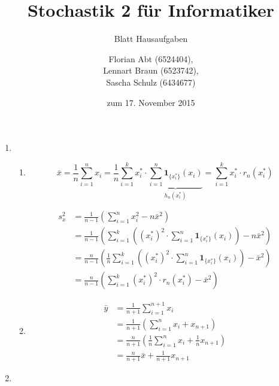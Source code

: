 \documentclass[a4paper]{scrartcl}
\title{Stochastik 2 für Informatiker}
\subtitle{Blatt {\blattnr} Hausaufgaben}
\author{
    Florian Abt (6524404), \\
    Lennart Braun (6523742), \\
    Sascha Schulz (6434677)
}
\date{zum 17. November 2015}
\def \blattnr {6}
\begin{document}
\maketitle

\begin{enumerate}[label=\bfseries \blattnr.\arabic*]

\item
\begin{enumerate}
 \item 
 
 \begin{equation*}
      \bar{x} 
      = \frac1n \sum_{i=1}^n x_i 
      = \frac1n \sum_{i=1}^k x_i^* \cdot \underbrace{\sum_{i=1}^n \textbf{1}_{\{x_i^*\}}(x_i)}_{h_n(x_i^*)}
      = \sum_{i=1}^k x_i^* \cdot r_n(x_i^*)
 \end{equation*}
 
 \begin{equation*}
  \begin{split}
     s_x^2 
     &= \frac1{n-1} \left( \sum_{i=1}^n x_i^2 - n\bar{x}^2 \right) \\
     &= \frac1{n-1} \left( \sum_{i=1}^k \left( (x_i^*)^2 \cdot \sum_{i=1}^n \textbf{1}_{\{x_i^*\}}(x_i) \right) - n\bar{x}^2  \right) \\
     &= \frac{n}{n-1} \left(\frac1n \sum_{i=1}^k \left( (x_i^*)^2 \cdot \sum_{i=1}^n \textbf{1}_{\{x_i^*\}}(x_i) \right) - \bar{x}^2  \right) \\
     &= \frac{n}{n-1} \left( \sum_{i=1}^k (x_i^*)^2 \cdot r_n(x_i^*) - \bar{x}^2  \right) 
     \end{split}
 \end{equation*}
 
 \item 
 \begin{equation*}
  \begin{split}
      \bar{y} 
      &= \frac1{n+1} \sum_{i=1}^{n+1} x_i  \\
      &= \frac1{n+1} \left( \sum_{i=1}^{n} x_i + x_{n+1} \right) \\
      &= \frac{n}{n+1} \left( \frac1n \sum_{i=1}^{n} x_i + \frac1n x_{n+1} \right) \\
      &= \frac{n}{n+1} \bar{x} + \frac1{n+1} x_{n+1}
  \end{split}
 \end{equation*}
 
\end{enumerate}

\item


\end{enumerate}
\end{document}
